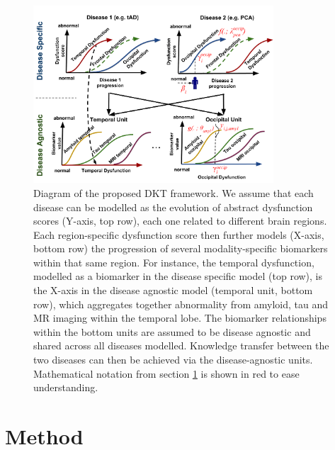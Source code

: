 \documentclass{llncs}
\begin{document}
\begin{figure}[h]
 \centering
 \includegraphics[width=0.8\textwidth,trim=0 0 0 0,clip]{disease_knowledge_transfer_symbols.pdf}
 \caption{Diagram of the proposed DKT framework. We assume that each disease can be modelled as the evolution of abstract dysfunction scores (Y-axis, top row), each one related to different brain regions. Each region-specific dysfunction score then further models (X-axis, bottom row) the progression of several modality-specific biomarkers within that same region. For instance, the temporal dysfunction, modelled as a biomarker in the disease specific model (top row), is the X-axis in the disease agnostic model (temporal unit, bottom row), which aggregates together abnormality from amyloid, tau and MR imaging within the temporal lobe. The biomarker relationships within the bottom units are assumed to be disease agnostic and shared across all diseases modelled. Knowledge transfer between the two diseases can then be achieved via the disease-agnostic units. Mathematical notation from section \ref{sec:method} is shown in red to ease understanding.}
 \label{fig:diagram}
\end{figure}

\section{Method}
\label{sec:method}


\newcommand{\lp}{\lambda_{d_i}^{\psi(k)}}
\newcommand{\lpuu}{\lambda_{d_i}^{\psi(k),(u)}}
\newcommand{\lpum}{\lambda_{d_i}^{\psi(k),(u-1)}}
\end{document}

